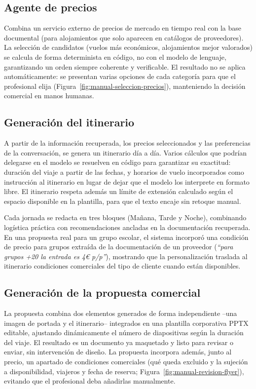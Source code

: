 \subsection{Agente de precios}
Combina un servicio externo de precios de mercado en tiempo real con la base documental (para alojamientos que solo aparecen en catálogos de proveedores). La selección de candidatos (vuelos más económicos, alojamientos mejor valorados) se calcula de forma determinista en código, no con el modelo de lenguaje, garantizando un orden siempre coherente y verificable. El resultado no se aplica automáticamente: se presentan varias opciones de cada categoría para que el profesional elija (Figura~\ref{fig:manual-seleccion-precios}), manteniendo la decisión comercial en manos humanas.

\subsection{Generación del itinerario}
A partir de la información recuperada, los precios seleccionados y las preferencias de la conversación, se genera un itinerario día a día. Varios cálculos que podrían delegarse en el modelo se resuelven en código para garantizar su exactitud: duración del viaje a partir de las fechas, y horarios de vuelo incorporados como instrucción al itinerario en lugar de dejar que el modelo los interprete en formato libre. El itinerario respeta además un límite de extensión calculado según el espacio disponible en la plantilla, para que el texto encaje sin retoque manual.

Cada jornada se redacta en tres bloques (Mañana, Tarde y Noche), combinando logística práctica con recomendaciones ancladas en la documentación recuperada. En una propuesta real para un grupo escolar, el sistema incorporó una condición de precio para grupos extraída de la documentación de un proveedor (\textit{``para grupos +20 la entrada es 4€ p/p''}), mostrando que la personalización traslada al itinerario condiciones comerciales del tipo de cliente cuando están disponibles.

\subsection{Generación de la propuesta comercial}
La propuesta combina dos elementos generados de forma independiente --una imagen de portada \parencite{openai-images-2025} y el itinerario-- integrados en una plantilla corporativa PPTX editable, ajustando dinámicamente el número de diapositivas según la duración del viaje. El resultado es un documento ya maquetado y listo para revisar o enviar, sin intervención de diseño. La propuesta incorpora además, junto al precio, un apartado de condiciones comerciales (qué queda excluido y la sujeción a disponibilidad, viajeros y fecha de reserva; Figura~\ref{fig:manual-revision-flyer}), evitando que el profesional deba añadirlas manualmente.

